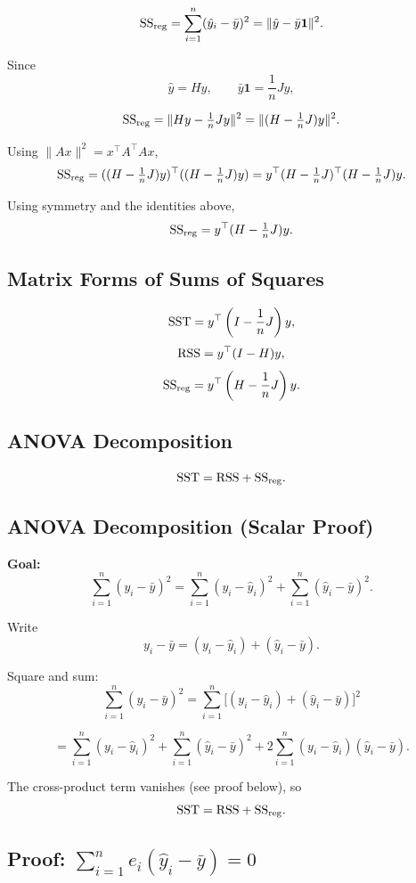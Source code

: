 \[
\mathrm{SS}_{\mathrm{reg}}
=\sum_{i=1}^n(\hat{y}_i-\bar{y})^2
=\|\hat{y}-\bar{y}\mathbf{1}\|^2.
\]

Since
\[
\hat{y} = Hy, \qquad \bar{y}\mathbf{1}=\frac{1}{n}Jy,
\]

\[
\mathrm{SS}_{\mathrm{reg}}
=\|Hy-\tfrac{1}{n}Jy\|^2
=\|(H-\tfrac{1}{n}J)y\|^2.
\]

Using $\|Ax\|^2 = x^\top A^\top A x$,
\[
\mathrm{SS}_{\mathrm{reg}}
=((H-\tfrac{1}{n}J)y)^\top((H-\tfrac{1}{n}J)y)
= y^\top(H-\tfrac{1}{n}J)^\top(H-\tfrac{1}{n}J)y.
\]

Using symmetry and the identities above,
\[
\mathrm{SS}_{\mathrm{reg}}=y^\top(H-\tfrac{1}{n}J)y.
\]

\subsection{Matrix Forms of Sums of Squares}

\begin{keyresult}
\[
\mathrm{SST} = y^\top\left(I-\frac{1}{n}J\right)y,
\]
\[
\mathrm{RSS} = y^\top(I-H)y,
\]
\[
\mathrm{SS}_{\mathrm{reg}} = y^\top\left(H-\frac{1}{n}J\right)y.
\]
\end{keyresult}

\subsection{ANOVA Decomposition}

\[
\mathrm{SST} = \mathrm{RSS} + \mathrm{SS}_{\mathrm{reg}}.
\]

\subsection{ANOVA Decomposition (Scalar Proof)}

\textbf{Goal:}
\[
\sum_{i=1}^{n}(y_i-\bar{y})^2
=
\sum_{i=1}^{n}(y_i-\hat{y}_i)^2
+
\sum_{i=1}^{n}(\hat{y}_i-\bar{y})^2.
\]

Write
\[
y_i-\bar{y}=(y_i-\hat{y}_i)+(\hat{y}_i-\bar{y}).
\]

Square and sum:
\[
\sum_{i=1}^{n}(y_i-\bar{y})^2
=
\sum_{i=1}^{n}\big[(y_i-\hat{y}_i)+(\hat{y}_i-\bar{y})\big]^2
\]

\[
=
\sum_{i=1}^{n}(y_i-\hat{y}_i)^2
+
\sum_{i=1}^{n}(\hat{y}_i-\bar{y})^2
+
2\sum_{i=1}^{n}(y_i-\hat{y}_i)(\hat{y}_i-\bar{y}).
\]

The cross-product term vanishes (see proof below), so
\[
\mathrm{SST} = \mathrm{RSS} + \mathrm{SS}_{\mathrm{reg}}.
\]

\subsection{Proof: $\sum_{i=1}^{n}e_i(\hat{y}_i-\bar{y}) = 0$}

